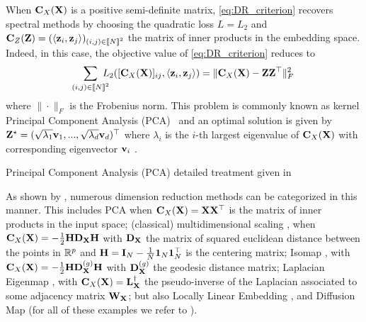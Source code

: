 When ${\mathbf{C}}_{X}({\mathbf{X}})$ is a positive semi-definite matrix, \cref{eq:DR_criterion}
recovers spectral methods by choosing the quadratic loss $L = L_2$ and ${\mathbf{C}}_{Z}({\mathbf{Z}}) = (\langle {\mathbf{z}}_i, {\mathbf{z}}_j \rangle)_{(i,j) \in {[\![N]\!]}^2}$ the matrix of inner
products in the embedding space. Indeed, in this case, the objective value of \cref{eq:DR_criterion}
reduces to
\begin{equation*}
\label{eq:spectral_method}
	\sum_{(i,j) \in {[\![N]\!]}^2} \!\!\!\!\! L_2([{\mathbf{C}}_{X}({\mathbf{X}})]_{ij}, \langle {\mathbf{z}}_i, {\mathbf{z}}_j \rangle) = \| {\mathbf{C}}_{X}({\mathbf{X}}) - {\mathbf{Z}}{\mathbf{Z}}^\top \|^2_F\,
\end{equation*}
where $\|\cdot\|_F$ is the Frobenius norm. This problem is commonly known as kernel Principal Component Analysis (PCA)~\citep{scholkopf1997kernel}
 and an optimal solution is given by
${\mathbf{Z}}^\star = (\sqrt{\lambda_1} {\mathbf{v}}_{1}, ..., \sqrt{\lambda_d} {\mathbf{v}}_{d})^\top$ where $\lambda_i$ is the $i$-th
largest eigenvalue of ${\mathbf{C}}_{X}({\mathbf{X}})$ with corresponding eigenvector ${\mathbf{v}}_{i}$ 
\citep{eckart1936approximation}.  


\begin{rem1}{Principal Component Analysis (PCA)}
detailed treatment given in 
\end{rem1}



As shown by \citet{ham2004kernel, ghojogh2021unified}, numerous dimension reduction methods can be categorized in this manner.
This includes PCA when ${\mathbf{C}}_{X}({\mathbf{X}}) = {\mathbf{X}}{\mathbf{X}}^\top$ is the matrix of inner products in the input space; (classical) multidimensional scaling \citep{borg2005modern}, when ${\mathbf{C}}_{X}({\mathbf{X}}) = -\frac{1}{2} {\mathbf{H}} {\mathbf{D}}_{\mathbf{X}} {\mathbf{H}}$ with ${\mathbf{D}}_{\mathbf{X}}$ the matrix of squared euclidean distance between the points in $\mathbb{R}^{p}$ and ${\mathbf{H}} = {\mathbf{I}}_N - \frac{1}{N} \bm{1}_N \bm{1}_N^\top$ is the centering matrix; Isomap \citep{tenenbaum2000global}, with ${\mathbf{C}}_{X}({\mathbf{X}}) = -\frac{1}{2} {\mathbf{H}} {\mathbf{D}}_{\mathbf{X}}^{(g)} {\mathbf{H}}$ with ${\mathbf{D}}_{\mathbf{X}}^{(g)}$ the geodesic distance matrix; Laplacian Eigenmap
\citep{belkin2003laplacian}, with ${\mathbf{C}}_{X}({\mathbf{X}}) = {\mathbf{L}}_{\mathbf{X}}^{\dagger}$ the pseudo-inverse of the Laplacian associated to some adjacency matrix ${\mathbf{W}}_{\mathbf{X}}$; but also Locally Linear Embedding \citep{roweis2000nonlinear}, and Diffusion Map \citep{coifman2006diffusion} (for all of these examples we refer to \citealt[Table 1]{ghojogh2021unified}).

